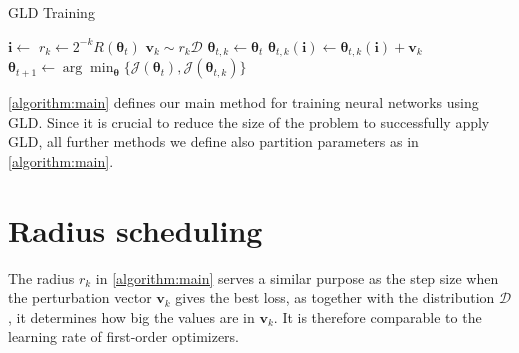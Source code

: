 \begin{algorithm} 
    \caption{\acl{GLD} Training}
    \label{algorithm:main}
    \begin{algorithmic}[1]
        \State $\mathbf{i} \gets $ 
        \State $r_k \gets 2^{-k}R(\bm{\theta}_t)$
        \State $\mathbf{v}_k \sim r_k \mathcal{D}$
        \State $\bm{\theta}_{t, k} \gets \bm{\theta}_t$
        \State $\bm{\theta}_{t,k}(\mathbf{i}) \gets \bm{\theta}_{t,k}(\mathbf{i}) + \mathbf{v}_k$
        \EndFor
        \State $\bm{\theta}_{t+1} \gets \arg \min_{\bm{\theta}} \{\mathcal{J}(\bm{\theta}_t), \mathcal{J}(\bm{\theta}_{t,k})\}$ 
        \EndFor
        \EndFor
    \end{algorithmic}
\end{algorithm}

\autoref{algorithm:main} defines our main method for
training neural networks using \ac{GLD}. Since it is 
crucial to reduce the size of the problem to
successfully apply \ac{GLD}, all
further methods we define also partition parameters as 
in \autoref{algorithm:main}. 

\section{Radius scheduling}
The radius $r_k$ in \autoref{algorithm:main} 
serves a similar purpose as the step size 
when the perturbation vector
$\mathbf{v}_k$ gives the best loss, as 
together with the distribution $\mathcal{D}$, 
it determines how big the values are in $\mathbf{v}_k$. 
It is therefore comparable to the learning
rate of first-order optimizers. 

